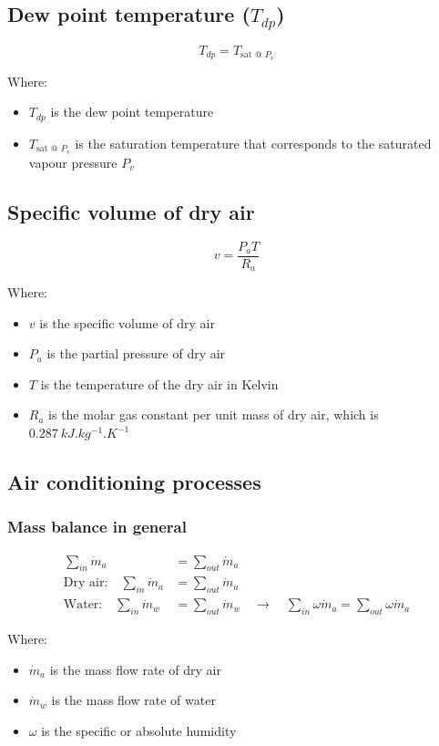 \documentclass[11pt]{article}
\begin{document}
\subsection{Dew point temperature (\(T_{dp}\))}
\label{sec:org7ea9efe}
\[T_{dp} = T_{\text{sat @ } P_v}\]

Where:
\begin{itemize}
\item \(T_{dp}\) is the dew point temperature
\item \(T_{\text{sat @ } P_v}\) is the saturation temperature that corresponds to the saturated vapour pressure \(P_v\)
\end{itemize}

\subsection{Specific volume of dry air}
\label{sec:org821777f}
\[v = \frac{P_a T}{R_a}\]

Where:
\begin{itemize}
\item \(v\) is the specific volume of dry air
\item \(P_a\) is the partial pressure of dry air
\item \(T\) is the temperature of the dry air in Kelvin
\item \(R_{a}\) is the molar gas constant per unit mass of dry air, which is \(\qty{0.287}{kJ.kg^{-1}.K^{-1}}\)
\end{itemize}

\subsection{Air conditioning processes}
\label{sec:orgd315a6c}

\subsubsection{Mass balance in general}
\label{sec:org1c93807}
\begin{align*}
\sum_{in} \dot{m}_a &= \sum_{out} \dot{m}_a \\
\text{Dry air:} \quad \sum_{in} \dot{m}_a &= \sum_{out} \dot{m}_a \\
\text{Water:} \quad \sum_{in} \dot{m}_w &= \sum_{out} \dot{m}_w \quad \rightarrow \quad \sum_{in} \omega \dot{m}_a = \sum_{out} \omega \dot{m}_a
\end{align*}

Where:
\begin{itemize}
\item \(\dot{m}_a\) is the mass flow rate of dry air
\item \(\dot{m}_w\) is the mass flow rate of water
\item \(\omega\) is the specific or absolute humidity
\end{itemize}
\end{document}

